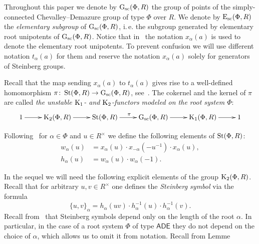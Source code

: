 Throughout this paper we denote by $\operatorname{G}_\mathrm{sc}(\Phi, R)$ the group of points of the simply-connected Chevalley--Demazure group of type $\Phi$ over $R$.
We denote by $\operatorname{E}_\mathrm{sc}(\Phi, R)$ the \textit{elementary subgroup} of $\operatorname{G}_\mathrm{sc}(\Phi, R)$, i.\,e. the subgroup generated by elementary root unipotents of $\operatorname{G}_\mathrm{sc}(\Phi, R)$.
Notice that in~\cite{VP, Vav09} the notation $x_\alpha(a)$ is used to denote the elementary root unipotents.
To prevent confusion we will use different notation $t_\alpha(a)$ for them and reserve the notation $x_\alpha(a)$ solely for generators of Steinberg groups.

Recall that the map sending $x_\alpha(a)$ to $t_\alpha(a)$ gives rise to a well-defined homomorphism $\pi \colon \operatorname{St}(\Phi, R) \to \operatorname{G}_\mathrm{sc}(\Phi, R)$, see~\cite[\S~1A]{St78}.
The cokernel and the kernel of $\pi$ are called \textit{the unstable $\operatorname{K}_1$- and $\operatorname{K}_2$-functors modeled on the root system $\Phi$}:
\begin{equation} \label{eq:K1-K2-sequence}
  \xymatrix{ 1 \ar[r] & \K_2(\Phi, R) \ar[r] & \St(\Phi, R) \ar[r]^{\pi} & \Gsc(\Phi, R) \ar[r] & \K_1(\Phi, R) \ar[r] & 1}
\end{equation}

Following~\cite{Ma69} for $\alpha\in\Phi$ and $u \in R^\times$ we define the following elements of $\operatorname{St}(\Phi, R)$:
\begin{align*} w_\alpha(u) & =  x_\alpha(u) \cdot x_{-\alpha}(-u^{-1}) \cdot x_\alpha(u), \\
               h_\alpha(u) & =  w_\alpha(u) \cdot w_\alpha(-1).  \end{align*}

In the sequel we will need the following explicit elements of the group $\operatorname{K}_2(\Phi, R)$.
Recall that for arbitrary $u, v \in R^\times$ one defines the \textit{Steinberg symbol} via the formula
\begin{equation} \label{eq:steinberg} \{ u, v \}_\alpha = h_\alpha(uv) \cdot h_\alpha^{-1}(u) \cdot h_\alpha^{-1}(v). \end{equation}
Recall from~\cite{Ma69} that Steinberg symbols depend only on the length of the root $\alpha$.
In particular, in the case of a root system $\Phi$ of type $\mathsf{ADE}$ they do not depend on the choice of $\alpha$, which allows us to omit it from notation.
Recall from Lemme

